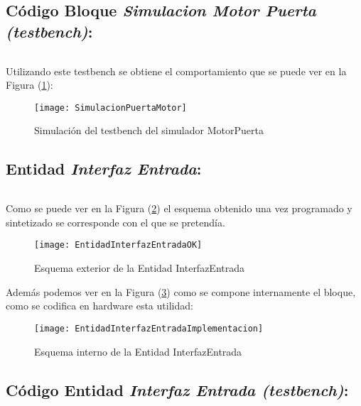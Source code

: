 \subsection{Código Bloque \textit{Simulacion Motor Puerta (testbench)}:} \label{code:MotorPuerta_tb}
	\inputminted[frame=lines,fontsize=\footnotesize,linenos]{vhdl}{CodeFiles/MotorPuerta_tb.vhd}

    Utilizando este testbench se obtiene el comportamiento que se puede ver en la Figura (\ref{fig:SimulacionMotorPuerta}):

    \begin{figure}[H]
		    \centering
		    \texttt{[image: SimulacionPuertaMotor]}
		    \caption{Simulación del testbench del simulador MotorPuerta}
		    \label{fig:SimulacionMotorPuerta}
	\end{figure}

\subsection{Entidad \textit{Interfaz Entrada}:} \label{code:InterfazEntrada}
	\inputminted[frame=lines,fontsize=\footnotesize,linenos]{vhdl}{CodeFiles/EntidadInterfazEntrada.vhd}

	Como se puede ver en la Figura (\ref{fig:EntidadInterfazEntradaOK}) el esquema obtenido una vez programado y sintetizado se corresponde con el que se pretendía.
    \begin{figure}[H]
		    \centering
		    \texttt{[image: EntidadInterfazEntradaOK]}
		    \caption{Esquema exterior de la Entidad InterfazEntrada}
		    \label{fig:EntidadInterfazEntradaOK}
	\end{figure}
    Además podemos ver en la Figura (\ref{fig:EntidadInterfazEntradaImplementacion}) como se compone internamente el bloque, como se codifica en hardware esta utilidad:
    \begin{figure}[H]
		    \centering
		    \texttt{[image: EntidadInterfazEntradaImplementacion]}
		    \caption{Esquema interno de la Entidad InterfazEntrada}
		    \label{fig:EntidadInterfazEntradaImplementacion}
	\end{figure}

\subsection{Código Entidad \textit{Interfaz Entrada (testbench)}:} \label{code:InterfazEntrada_tb}
	\inputminted[frame=lines,fontsize=\footnotesize,linenos]{vhdl}{CodeFiles/EntidadInterfazEntrada_tb.vhd}

